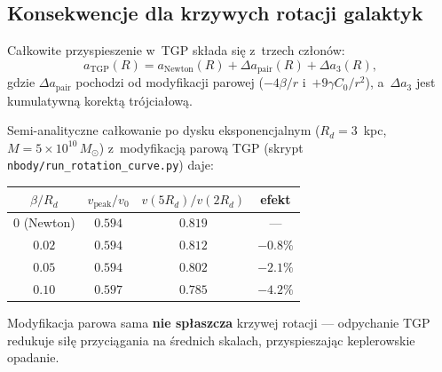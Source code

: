 \subsection{Konsekwencje dla krzywych rotacji galaktyk}%
\label{ssec:rotation-curves}

Ca\l{}kowite przyspieszenie w~TGP sk\l{}ada si\k{e} z~trzech
cz\l{}on\'ow:
\begin{equation}\label{eq:a-total}
  a_{\mathrm{TGP}}(R) = a_{\mathrm{Newton}}(R)
  + \Delta a_{\mathrm{pair}}(R)
  + \Delta a_3(R),
\end{equation}
gdzie $\Delta a_{\mathrm{pair}}$ pochodzi od modyfikacji parowej
($-4\beta/r$ i~$+9\gamma C_0/r^2$), a~$\Delta a_3$ jest
kumulatywn\k{a} korekt\k{a} tr\'ojcia\l{}ow\k{a}.

\begin{remark}%
\label{rem:rotation-results}
Semi-analityczne ca\l{}kowanie po dysku eksponencjalnym
($R_d = 3$~kpc, $M = 5\times10^{10}\,M_\odot$)
z~modyfikacj\k{a} parow\k{a} TGP (skrypt
\texttt{nbody/run\_rotation\_curve.py}) daje:
\begin{center}
\begin{tabular}{cccc}
\toprule
$\beta/R_d$ & $v_{\mathrm{peak}}/v_0$ &
$v(5R_d)/v(2R_d)$ & efekt \\
\midrule
$0$ (Newton) & $0.594$ & $0.819$ & --- \\
$0.02$ & $0.594$ & $0.812$ & $-0.8\%$ \\
$0.05$ & $0.594$ & $0.802$ & $-2.1\%$ \\
$0.10$ & $0.597$ & $0.785$ & $-4.2\%$ \\
\bottomrule
\end{tabular}
\end{center}

Modyfikacja parowa sama \textbf{nie sp\l{}aszcza} krzywej rotacji
--- odpychanie TGP redukuje si\l{}\k{e} przyci\k{a}gania
na \'srednich skalach, przyspieszaj\k{a}c keplerowskie opadanie.
\end{remark}

